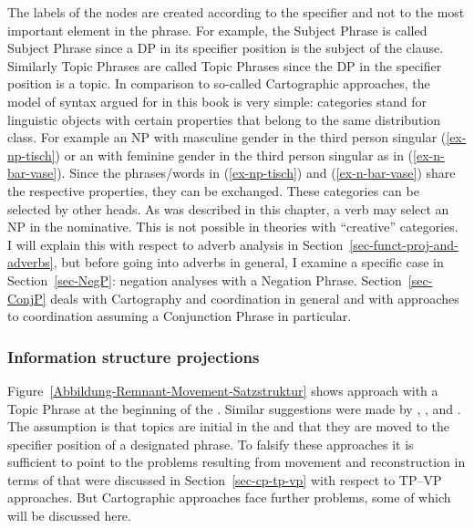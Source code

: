 The labels of the nodes are created according to the specifier and not to the most important element
in the phrase. For example, the Subject Phrase is called Subject Phrase since a DP in its specifier
position is the subject of the clause. Similarly Topic Phrases are called Topic Phrases since the DP
in the specifier position is a topic. 
In comparison to so-called Cartographic approaches, the model of syntax argued for in this book is very simple: categories stand for linguistic objects
with certain properties that belong to the same distribution class. For example an NP with masculine
gender in the third person singular (\ref{ex-np-tisch}) or an \nbar with feminine gender in the third person
singular as in (\ref{ex-n-bar-vase}). Since the phrases/words in (\ref{ex-np-tisch}) and
(\ref{ex-n-bar-vase}) share the respective properties, they can be exchanged. These categories can be
selected by other heads. As was described in this chapter, a verb may select an NP in the
nominative. This is not possible in theories with ``creative'' categories. I will explain this with
respect to  adverb analysis in Section~\ref{sec-funct-proj-and-adverbs}, but
before going into adverbs in general, I examine a specific case in Section~\ref{sec-NegP}: negation
analyses with a Negation Phrase. Section~\ref{sec-ConjP} deals with Cartography and coordination in
general and with approaches to coordination assuming a Conjunction Phrase in particular.



\subsubsection{Information structure projections}

Figure~\ref{Abbildung-Remnant-Movement-Satzstruktur} shows  approach with a Topic Phrase at the
beginning of the \mf. Similar suggestions were made by \citet[, 495]{MS93a-u}, \citet{Haftka95a}, \citet{Frey2004b-u} and
\citet[]{Grewendorf2005a-u}. The assumption is that topics
are initial in the \mf and that they are moved to the specifier position of a designated phrase. To
falsify these approaches it is sufficient to point to the problems resulting from movement and
reconstruction in terms of  that were discussed in Section~\ref{sec-cp-tp-vp} with respect to TP–VP
approaches. But Cartographic approaches face further problems, some of which will be
discussed here.

